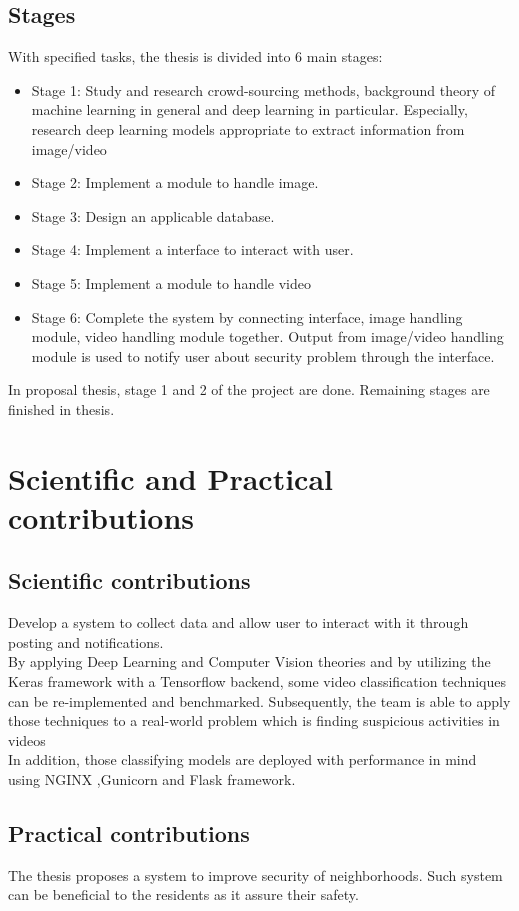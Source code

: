 \subsection{Stages}
With specified tasks, the thesis is divided into 6 main stages:
\begin{itemize}
	\item Stage 1: Study and research crowd-sourcing methods, background theory of machine learning in general and deep learning in particular. Especially, research deep learning models appropriate to extract information from image/video
	\item Stage 2: Implement a module to handle image. 
	\item Stage 3: Design an applicable database.
	\item Stage 4: Implement a interface to interact with user.
	\item Stage 5: Implement a module to handle video
	\item Stage 6: Complete the system by connecting interface, image handling module, video handling module together. Output from image/video handling module is used to notify user about security problem through the interface.
\end{itemize} 
In proposal thesis, stage 1 and 2 of the project are done. Remaining stages are finished in thesis.  
\section{Scientific and Practical contributions}
\subsection{Scientific contributions}
Develop a system to collect data and allow user to interact with it through posting and notifications. \\
By applying Deep Learning and Computer Vision theories and by utilizing the Keras framework with a Tensorflow backend, some video classification techniques can be re-implemented and benchmarked. Subsequently, the team is able to apply those techniques to a real-world problem which is finding suspicious activities in videos \\ %
In addition, those classifying models are deployed with performance in mind using NGINX ,Gunicorn and Flask framework.
\subsection{Practical contributions}
The thesis proposes a system to improve security of neighborhoods. Such system can be beneficial to the residents as it assure their safety.
